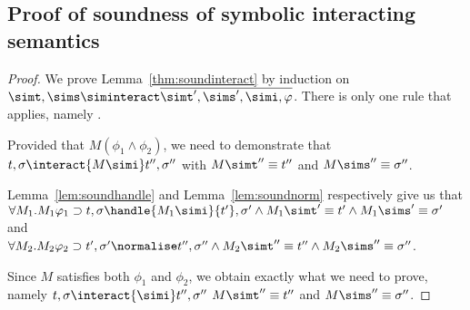 \subsection{Proof of soundness of symbolic interacting semantics}
\begin{proof}
  We prove Lemma~\ref{thm:soundinteract} by induction on $\simt,\sims\siminteract \overline{\simt',
  \sims',\simi,\phi}$.
  There is only one rule that applies, namely
  .

  Provided that $M(\phi_1\land\phi_2)$, we need to demonstrate that
  $t,\sigma\interact{M\simi}t'',\sigma''$ with
  $M \simt'' \equiv {t''}$ and $M\sims''\equiv {\sigma''}$.


  Lemma~\ref{lem:soundhandle} and Lemma~\ref{lem:soundnorm} respectively give us that\\
$\forall M_1 . M_1 \phi_1 \implies t,\sigma \handle{M_1 \simi} {t'},{\sigma'}\land M_1 \simt'\equiv{t'}\land M_1\sims' \equiv {\sigma'}$ and \\
$\forall M_2 . M_2 \phi_2 \implies t',\sigma' {\normalise} {t''},{\sigma''}\land M_2 \simt''\equiv{t''}\land M_2\sims'' \equiv {\sigma''}$.

Since $M$ satisfies both $\phi_1$ and $\phi_2$,
we obtain exactly what we need to prove,
namely
$t,\sigma\interact{\simi}t'',\sigma''$
$M \simt'' \equiv {t''}$ and $M\sims''\equiv {\sigma''}$.

\end{proof}
